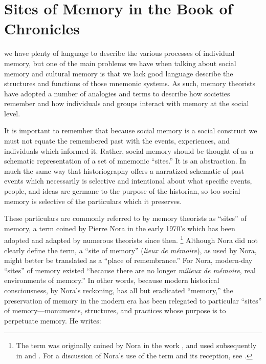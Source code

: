 
\section{Sites of Memory in the Book of Chronicles}


we have plenty of language to describe the various processes of individual memory, but one of the main problems we have when talking about social memory and cultural memory is that we lack good language describe the structures and functions of those mnemonic systems. As such, memory theorists have adopted a number of analogies and terms to describe how societies remember and how individuals and groups interact with memory at the social level. 

It is important to remember that because social memory is a social construct we must not equate the remembered past with the events, experiences, and individuals which informed it. Rather, social memory should be thought of as a schematic representation of a set of mnemonic ``sites.'' It is an abstraction. In much the same way that historiography offers a narratized schematic of past events which necessarily is selective and intentional about what specific events, people, and ideas are germane to the purpose of the historian, so too social memory is selective of the particulars which it preserves. 

These particulars are commonly referred to by memory theorists as ``sites'' of memory, a term coined by Pierre Nora in the early 1970's which has been adopted and adapted by numerous theorists since then.%
    \footnote{%
        The term was originally coined by Nora in the work
        \cite*{nora_goff-nora1974}, and used subsequently in 
        \cite*{nora1984} and 
        \cite*{nora_representations1989}. For a discussion of Nora's use of the term and its reception, see 
        \cite{szpociński_teksty-drugie2016}.}
Although Nora did not clearly define the term, a ``site of memory'' (\emph{lieux de mémoire}), as used by Nora, might better be translated as a ``place of remembrance.'' For Nora, modern-day ``sites'' of memory existed ``because there are no longer \emph{milieux de mémoire}, real environments of memory.''%
    \autocite[7]{nora_representations1989}
In other words, because modern historical consciousness, by Nora's reckoning, has all but eradicated ``memory,'' the preservation of memory in the modern era has been relegated to particular ``sites'' of memory---monuments, structures, and practices whose purpose is to perpetuate memory. He writes:

